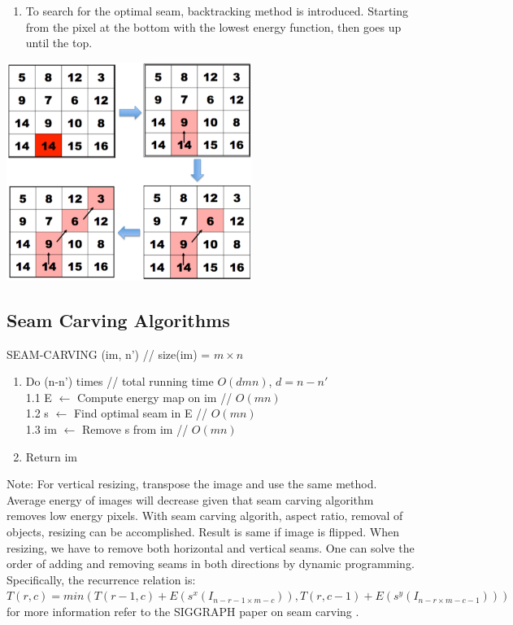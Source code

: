 \documentclass{article}
\begin{document}
\begin{enumerate}
\begin{center}
\end{center}
\item To search for the optimal seam, backtracking method is introduced. Starting from the pixel at the bottom with the lowest energy function, then goes up until the top. 
\end{enumerate}
\begin{center}
\hspace*{1.4cm}\includegraphics[width=8cm]{backtrack.png}
\end{center}
\subsection{Seam Carving Algorithms}
SEAM-CARVING (im, n') // size(im) = $m \times n$\\
\begin{enumerate}
\item Do (n-n') times // total running time $O(dmn)$, $d = n-n'$\\
1.1 E $\leftarrow$ Compute energy map on im // $O(mn)$\\
1.2 s $\leftarrow$ Find optimal seam in E // $O(mn)$\\
1.3 im $\leftarrow$ Remove s from im // $O(mn)$
\item Return im
\end{enumerate}


Note: For vertical resizing, transpose the image and use the same method.\\

Average energy of images will decrease given that seam carving algorithm removes low energy pixels. With seam carving algorith, aspect ratio, removal of objects, resizing can be accomplished. Result is same if image is flipped. When resizing, we have to remove both horizontal and vertical seams. One can solve the order of adding and removing seams in both directions by dynamic programming. Specifically, the recurrence relation is: $T(r,c)=min(T(r-1,c)+E(s^x(I_{n-r-1\times m-c})),T(r,c-1)+E(s^y(I_{n-r\times m-c-1})))$ for more information refer to the SIGGRAPH paper on seam carving \cite{siggraphseamcarving}. 
\end{document}
